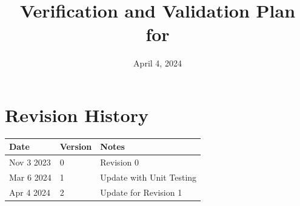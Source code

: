 \documentclass[12pt, titlepage]{article}
\begin{document}
\title{Verification and Validation Plan for \progname{}} 
\author{\authname}
\date{April 4, 2024}
	
\maketitle


\section*{Revision History}

\begin{tabularx}{\textwidth}{p{3cm}p{2cm}X}
\toprule {\bf Date} & {\bf Version} & {\bf Notes}\\
\midrule
Nov 3 2023 & 0 & Revision 0\\
Mar 6 2024 & 1 & Update with Unit Testing\\
Apr 4 2024 & 2 & Update for Revision 1 \\
\bottomrule
\end{tabularx}



\newpage

\tableofcontents



\newpage

\end{document}
